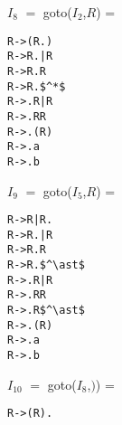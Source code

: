 \documentclass[12pt,fullpage]{exam}
\begin{document}
\begin{questions}
\begin{multicols}{2}
\begin{lstlisting}
\end{lstlisting}
$I_8$ $=$ goto($I_2$,$R$) =
\begin{lstlisting}
R->(R.)
R->R.|R
R->R.R
R->R.$^*$
R->.R|R
R->.RR
R->.(R)
R->.a
R->.b

\end{lstlisting}

$I_9$ $=$ goto($I_5$,$R$) =
\begin{lstlisting}
R->R|R.
R->R.|R
R->R.R
R->R.$^\ast$
R->.R|R
R->.RR
R->.R$^\ast$
R->.(R)
R->.a
R->.b

\end{lstlisting}

$I_{10}$ $=$ goto($I_8$,$)$) =
\begin{lstlisting}
R->(R).

\end{lstlisting}
\end{multicols}
\begin{figure}
    \centering
    


\begin{tikzpicture}[x=0.75pt,y=0.75pt,yscale=-1,xscale=1]


\end{tikzpicture}
\end{figure}
\end{questions}
\end{document}
